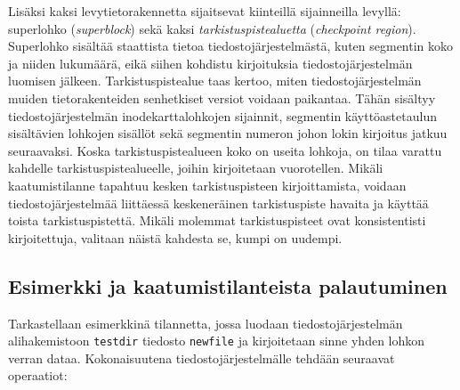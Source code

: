 Lisäksi kaksi levytietorakennetta sijaitsevat kiinteillä sijainneilla levyllä: superlohko (\emph{superblock}) sekä kaksi \emph{tarkistuspistealuetta} (\emph{checkpoint region}).
Superlohko sisältää staattista tietoa tiedostojärjestelmästä,
kuten segmentin koko ja niiden lukumäärä, eikä siihen kohdistu kirjoituksia tiedostojärjestelmän luomisen jälkeen.
Tarkistuspistealue taas kertoo,
miten tiedostojärjestelmän muiden tietorakenteiden senhetkiset versiot voidaan paikantaa.
Tähän sisältyy tiedostojärjestelmän inodekarttalohkojen sijainnit, segmentin käyttöastetaulun sisältävien lohkojen sisällöt sekä segmentin numeron johon lokin kirjoitus jatkuu seuraavaksi.
Koska tarkistuspistealueen koko on useita lohkoja, on tilaa varattu kahdelle tarkistuspistealueelle,
joihin kirjoitetaan vuorotellen.
Mikäli kaatumistilanne tapahtuu kesken tarkistuspisteen kirjoittamista, voidaan tiedostojärjestelmää liittäessä keskeneräinen tarkistuspiste havaita ja käyttää toista tarkistuspistettä.
Mikäli molemmat tarkistuspisteet ovat konsistentisti kirjoitettuja, valitaan näistä kahdesta se,
kumpi on uudempi.

\subsection{Esimerkki ja kaatumistilanteista palautuminen}
\label{SubsectSpriteLfsExample}

Tarkastellaan esimerkkinä tilannetta,
jossa luodaan tiedostojärjestelmän alihakemistoon \texttt{testdir} tiedosto \texttt{newfile} ja kirjoitetaan sinne yhden lohkon verran dataa.
Kokonaisuutena tiedostojärjestelmälle tehdään seuraavat operaatiot:

